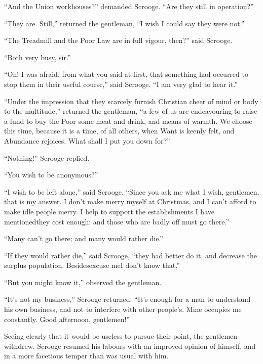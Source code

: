\documentclass[paper=5.5in:8.5in,BCOR=7mm,twoside,DIV=calc,12pt,usegeometry]{scrbook} %
\begin{document}
\enquote{And the Union workhouses?} demanded Scrooge. \enquote{Are they still in operation?}

\enquote{They are. Still,} returned the gentleman, \enquote{I wish I could say they were not.}

\enquote{The Treadmill and the Poor Law are in full vigour, then?} said Scrooge.

\enquote{Both very busy, sir.}

\enquote{Oh! I was afraid, from what you said at first, that something had occurred to stop them in their useful course,} said Scrooge. \enquote{I am very glad to hear it.}

\enquote{Under the impression that they scarcely furnish Christian cheer of mind or body to the multitude,} returned the gentleman, \enquote{a few of us are endeavouring to raise a fund to buy the Poor some meat and drink, and means of warmth. We choose this time, because it is a time, of all others, when Want is keenly felt, and Abundance rejoices. What shall I put you down for?}

\enquote{Nothing!} Scrooge replied.

\enquote{You wish to be anonymous?}

\enquote{I wish to be left alone,} said Scrooge. \enquote{Since you ask me what I wish, gentlemen, that is my answer. I don't make merry myself at Christmas, and I can't afford to make idle people merry. I help to support the establishments I have mentioned\textemdash they cost enough: and those who are badly off must go there.}

\enquote{Many can't go there; and many would rather die.}

\enquote{If they would rather die,} said Scrooge, \enquote{they had better do it, and decrease the surplus population. Besides\textemdash excuse me\textemdash I don't know that.}

\enquote{But you might know it,} observed the gentleman.

\enquote{It's not my business,} Scrooge returned. \enquote{It's enough for a man to understand his own business, and not to interfere with other people's. Mine occupies me constantly. Good afternoon, gentlemen!}

Seeing clearly that it would be useless to pursue their point, the gentlemen withdrew. Scrooge resumed his labours with an improved opinion of himself, and in a more facetious temper than was usual with him.
\end{document}
